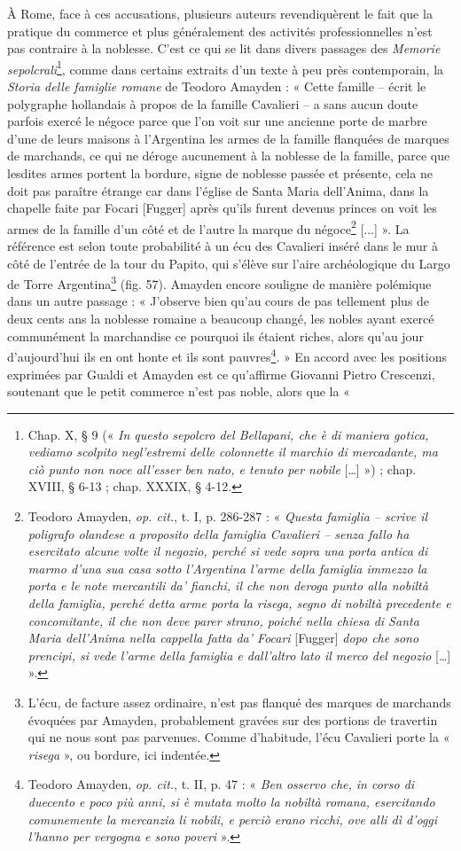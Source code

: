\documentclass[12pt,twoside,openany]{book}
\begin{document}
À Rome, face à ces accusations, plusieurs auteurs revendiquèrent le fait que la pratique du commerce et plus généralement des activités professionnelles n’est pas contraire à la noblesse. C’est ce qui se lit dans divers passages des \textit{Memorie sepolcrali}\footnote{Chap. X, § 9 (« \textit{In questo sepolcro del Bellapani, che è di maniera gotica, vediamo scolpito negl’estremi delle colonnette il marchio di mercadante, ma ciò punto non noce all’esser ben nato, e tenuto per nobile }[…] ») ; chap. XVIII, § 6-13 ; chap. XXXIX, § 4-12.}, comme dans certains extraits d’un texte à peu près contemporain, la\textit{ Storia delle famiglie romane} de Teodoro Amayden : « Cette famille – écrit le polygraphe hollandais à propos de la famille Cavalieri – a sans aucun doute parfois exercé le négoce parce que l’on voit sur une ancienne porte de marbre d’une de leurs maisons à l’Argentina les armes de la famille flanquées de marques de marchands, ce qui ne déroge aucunement à la noblesse de la famille, parce que lesdites armes portent la bordure, signe de noblesse passée et présente, cela ne doit pas paraître étrange car dans l’église de Santa Maria dell’Anima, dans la chapelle faite par Focari [Fugger] après qu’ils furent devenus princes on voit les armes de la famille d’un côté et de l’autre la marque du négoce\footnote{Teodoro Amayden, \textit{op. cit.}, t. I, p. 286-287 : « \textit{Questa famiglia – scrive il poligrafo olandese a proposito della famiglia Cavalieri – senza fallo ha esercitato alcune volte il negozio, perché si vede sopra una porta antica di marmo d’una sua casa sotto l’Argentina l’arme della famiglia immezzo la porta e le note mercantili da’ fianchi, il che non deroga punto alla nobiltà della famiglia, perché detta arme porta la risega, segno di nobiltà precedente e concomitante, il che non deve parer strano, poiché nella chiesa di Santa Maria dell’Anima nella cappella fatta da’ Focari }[Fugger]\textit{ dopo che sono prencipi, si vede l’arme della famiglia e dall’altro lato il merco del negozio }[…] ».} [...] ». La référence est selon toute probabilité à un écu des Cavalieri inséré dans le mur à côté de l’entrée de la tour du Papito, qui s’élève sur l’aire archéologique du Largo de Torre Argentina\footnote{L’écu, de facture assez ordinaire, n’est pas flanqué des marques de marchands évoquées par Amayden, probablement gravées sur des portions de travertin qui ne nous sont pas parvenues. Comme d’habitude, l’écu Cavalieri porte la « \textit{risega} », ou bordure, ici indentée.} (fig. 57). Amayden encore souligne de manière polémique dans un autre passage : « J’observe bien qu’au cours de pas tellement plus de deux cents ans la noblesse romaine a beaucoup changé, les nobles ayant exercé communément la marchandise ce pourquoi ils étaient riches, alors qu’au jour d’aujourd’hui ils en ont honte et ils sont pauvres\footnote{Teodoro Amayden, \textit{op. cit.}, t. II, p. 47 : « \textit{Ben osservo che, in corso di duecento e poco più anni, si è mutata molto la nobiltà romana, esercitando comunemente la mercanzia li nobili, e perciò erano ricchi, ove alli dì d’oggi l’hanno per vergogna e sono poveri }».}. » En accord avec les positions exprimées par Gualdi et Amayden est ce qu’affirme Giovanni Pietro Crescenzi, soutenant que le petit commerce n’est pas noble, alors que la « 
\end{document}

